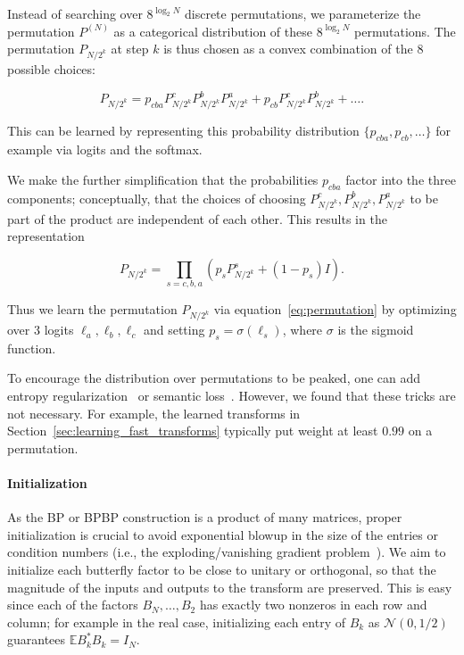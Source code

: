 Instead of searching over $8^{\log_2 N}$ discrete permutations, we parameterize the permutation $P^{(N)}$ as a categorical distribution of these $8^{\log_2 N}$ permutations. The permutation $P_{N/2^k}$ at step $k$ is thus chosen as a convex combination of the $8$ possible choices:

\begin{equation*}
  P_{N/2^k} = p_{cba} P_{N/2^k}^cP_{N/2^k}^bP_{N/2^k}^a + p_{cb}P_{N/2^k}^cP_{N/2^k}^b + \dots.
\end{equation*}

This can be learned by representing this probability distribution $\{p_{cba}, p_{cb},\dots\}$ for example via logits and the softmax.

We make the further simplification that the probabilities $p_{cba}$ factor into the three components; conceptually, that the choices of choosing $P_{N/2^k}^c, P_{N/2^k}^b, P_{N/2^k}^a$ to be part of the product are independent of each other. This results in the representation

\begin{equation}
  \label{eq:permutation}
  P_{N/2^k} = \prod_{s=c,b,a} (p_s P_{N/2^k}^s + (1-p_s)I). 
\end{equation}

Thus we learn the permutation $P_{N/2^k}$ via equation~\eqref{eq:permutation} by optimizing over $3$ logits $\ell_a, \ell_b, \ell_c$ and setting $p_s = \sigma(\ell_s)$, where $\sigma$ is the sigmoid function.

To encourage the distribution over permutations to be peaked, one can add entropy regularization~\citep{grandvalet2005semi} or semantic loss~\citep{xu2018a}. However, we found that these tricks are not necessary. For example, the learned transforms in
Section~\ref{sec:learning_fast_transforms} typically put weight at least $0.99$ on a permutation.

\paragraph{Initialization}

As the BP or BPBP construction is a product of many matrices, proper initialization is crucial to avoid exponential blowup in the size of the entries or condition numbers (i.e., the exploding/vanishing gradient problem~\citep{pascanu2013difficulty}). We aim to initialize each butterfly factor to be close to unitary or orthogonal, so that the magnitude of the inputs and outputs to the transform are preserved. This is easy since each of the factors $B_N, \dots, B_2$ has exactly two nonzeros in each row and column; for example in the real case, initializing each entry of $B_k$ as
$\mathcal{N}(0,1/2)$ guarantees $ \mathbb{E} B_k^* B_k = I_N$.

